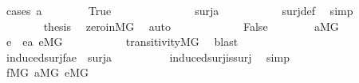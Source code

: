 \begin{isabellebody}
\ {\isacharparenleft}{\kern0pt}cases\ {\isachardoublequoteopen}a{\isacharequal}{\kern0pt}{}{\isachardoublequoteclose}{\isacharparenright}{\kern0pt}\isanewline
\ \ \ \ \ \ \isamarkupfalse%
\ True\isanewline
\ \ \ \ \ \ \isamarkupfalse%
\isanewline
\ \ \ \ \ \ \isamarkupfalse%
\ {\isachardoublequoteopen}{}{\isasymin}surj{\isacharparenleft}{\kern0pt}{}{\isacharcomma}{\kern0pt}a{\isacharparenright}{\kern0pt}{\isachardoublequoteclose}\ \isanewline
\ \ \ \ \ \ \ \ \isamarkupfalse%
\ surj{\isacharunderscore}{\kern0pt}def\ \isamarkupfalse%
\ simp\isanewline
\ \ \ \ \ \ \isamarkupfalse%
\isanewline
\ \ \ \ \ \ \isamarkupfalse%
\ {\isacharquery}{\kern0pt}thesis\ \isamarkupfalse%
\ zero{\isacharunderscore}{\kern0pt}in{\isacharunderscore}{\kern0pt}MG\ \isamarkupfalse%
\ auto\isanewline
\ \ \ \ \isamarkupfalse%
\isanewline
\ \ \ \ \ \ \isamarkupfalse%
\ False\isanewline
\ \ \ \ \ \ \isamarkupfalse%
\ {\isacartoucheopen}a{\isasymin}M{\isacharbrackleft}{\kern0pt}G{\isacharbrackright}{\kern0pt}{\isacartoucheclose}\ \isanewline
\ \ \ \ \ \ \isamarkupfalse%
\ e\ \ {\isachardoublequoteopen}e{\isasymin}a{\isachardoublequoteclose}\ {\isachardoublequoteopen}e{\isasymin}M{\isacharbrackleft}{\kern0pt}G{\isacharbrackright}{\kern0pt}{\isachardoublequoteclose}\ \isanewline
\ \ \ \ \ \ \ \ \isamarkupfalse%
\ transitivity{\isacharunderscore}{\kern0pt}MG\ \isamarkupfalse%
\ blast\isanewline
\ \ \ \ \ \ \isamarkupfalse%
\ {}\ \ {}\isanewline
\ \ \ \ \ \ \isamarkupfalse%
\ {\isachardoublequoteopen}induced{\isacharunderscore}{\kern0pt}surj{\isacharparenleft}{\kern0pt}f{\isacharcomma}{\kern0pt}a{\isacharcomma}{\kern0pt}e{\isacharparenright}{\kern0pt}\ {\isasymin}\ surj{\isacharparenleft}{\kern0pt}{\isasymalpha}{\isacharcomma}{\kern0pt}a{\isacharparenright}{\kern0pt}{\isachardoublequoteclose}\isanewline
\ \ \ \ \ \ \ \ \isamarkupfalse%
\ induced{\isacharunderscore}{\kern0pt}surj{\isacharunderscore}{\kern0pt}is{\isacharunderscore}{\kern0pt}surj\ \isamarkupfalse%
\ simp\isanewline
\ \ \ \ \ \ \isamarkupfalse%
\ \isamarkupfalse%
\ {\isacartoucheopen}f{\isasymin}M{\isacharbrackleft}{\kern0pt}G{\isacharbrackright}{\kern0pt}{\isacartoucheclose}\ {\isacartoucheopen}a{\isasymin}M{\isacharbrackleft}{\kern0pt}G{\isacharbrackright}{\kern0pt}{\isacartoucheclose}\ {\isacartoucheopen}e{\isasymin}M{\isacharbrackleft}{\kern0pt}G{\isacharbrackright}{\kern0pt}{\isacartoucheclose}\isanewline

\end{isabellebody}
